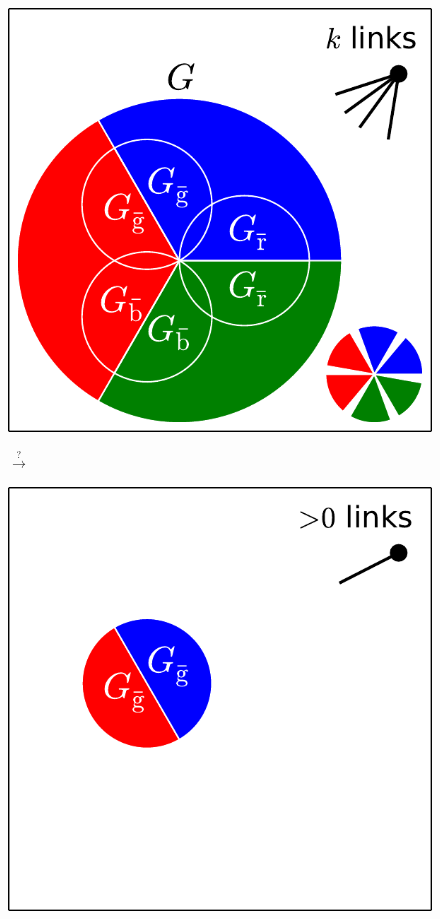 \documentclass[aps, pre, onecolumn, a4paper, floatfix]{revtex4}
\begin{document}
\begin{figure}[htb]
  \begin{minipage}[b]{0.245\linewidth}
    \begin{center}
    \includegraphics[width=0.99\columnwidth]{sets_k_all.pdf}
   \end{center}
  \end{minipage}
  \begin{minipage}[b]{0.1\linewidth}
    \begin{center}
      {\Large $\xrightarrow{?}$}\\
      \vspace{20mm}
    \end{center}
  \end{minipage}
  \begin{minipage}[b]{0.6\linewidth}
    \begin{center}
    \includegraphics[height=0.4\columnwidth]{sets_k_gc_no_2.pdf}

\end{center}
\end{minipage}
\end{figure}
\end{document}
